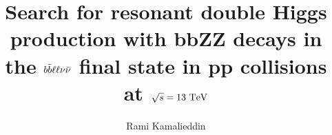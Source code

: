 \documentclass[print]{nuthesis}
\newcommand{\bbbar}{\ensuremath{b\bar{b}}\xspace}
\begin{document}
%
%


\renewcommand\bibname{References}
\frontmatter

\title{Search for resonant double Higgs production with \MakeLowercase{bb}ZZ decays in the $\MakeLowercase{\bbbar\ell\ell\nu\bar{\nu}}$ final state in \MakeLowercase{pp} collisions at ${\sqrt{\MakeLowercase{s}}=\textrm{13 T\MakeLowercase{e}V}}$}

\author{Rami Kamalieddin}

\maketitle
\begin{abstract}


\end{abstract}



\iffalse
\newenvironment{my_dedication}
  {\clearpage           %
   \thispagestyle{empty}%
   \vspace*{0cm}%
  \section*{} %
   \itshape             %
   \raggedleft          %
  }
  {\par %
   \vspace{\stretch{3}} %
   \clearpage           %
  }
\end{document}
